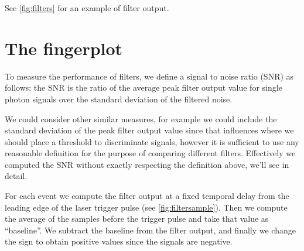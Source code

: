 \begin{figure}
    

\end{figure}

See \autoref{fig:filters} for an example of filter output.

\begin{figure}
    

\end{figure}

\section{The fingerplot}
\label{sec:fingerplot}

To measure the performance of filters, we define a signal to noise ratio (SNR)
as follows: the SNR is the ratio of the average peak filter output value for
single photon signals over the standard deviation of the filtered noise.

We could consider other similar measures, for example we could include the
standard deviation of the peak filter output value since that influences where
we should place a threshold to discriminate signals, however it is sufficient
to use any reasonable definition for the purpose of comparing different
filters. Effectively we computed the SNR without exactly respecting the
definition above, we'll see in detail.

For each event we compute the filter output at a fixed temporal delay from the
leading edge of the laser trigger pulse (see \autoref{fig:filtersample}).
Then we compute the average of the samples before the trigger pulse and take
that value as ``baseline''. We subtract the baseline from the filter output,
and finally we change the sign to obtain positive values since the signals are
negative.

\begin{figure}
    

\end{figure}

